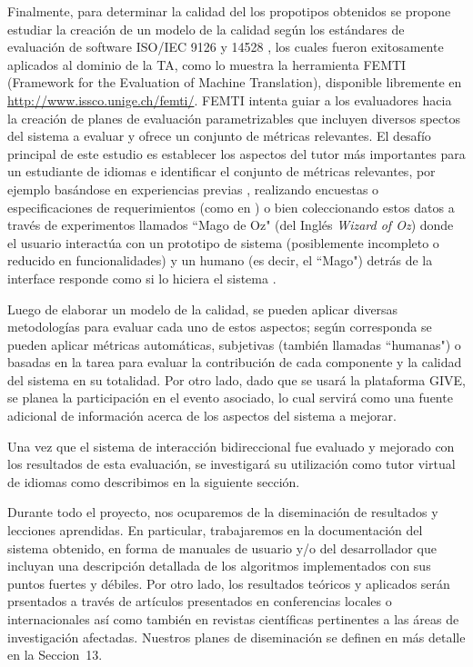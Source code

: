 Finalmente, para determinar la calidad del los propotipos obtenidos se propone
estudiar la creaci\'on de un modelo de la calidad seg\'un los est\'andares de
evaluaci\'on de software ISO/IEC 9126 y 14528 \citep{ISO9126-1, ISO14598-1}, los
cuales fueron exitosamente aplicados al dominio de la TA, como lo muestra la
herramienta FEMTI (Framework for the Evaluation of Machine Translation),
disponible libremente en \url{http://www.issco.unige.ch/femti/}. FEMTI
\citep{Est2005} intenta guiar a los evaluadores hacia la creaci\'on de planes de
evaluaci\'on parametrizables que incluyen diversos spectos del sistema a evaluar
y ofrece un conjunto de m\'etricas relevantes. El desaf\'io principal de este
estudio es establecer los aspectos del tutor m\'as importantes para un
estudiante de idiomas e identificar el conjunto de m\'etricas relevantes, por
ejemplo bas\'andose en experiencias previas \citep{paradise06, Chu2000,
Litman2002}, realizando encuestas o especificaciones de requerimientos (como en
\citep{Lecoeuche98}) o bien coleccionando estos datos a trav\'es de experimentos
llamados ``Mago de Oz" (del Ingl\'es \textit{Wizard of Oz}) donde el usuario
interact\'ua con un prototipo de sistema (posiblemente incompleto o reducido en
funcionalidades) y un humano (es decir, el ``Mago") detr\'as de la interface
responde como si lo hiciera el sistema \citep{Dahlback93, Fabbrizio05}.

Luego de elaborar un modelo de la calidad, se pueden aplicar diversas metodolog\'ias para evaluar cada uno de estos aspectos; seg\'un corresponda se pueden aplicar m\'etricas autom\'aticas, subjetivas (tambi\'en llamadas ``humanas") o basadas en la tarea para evaluar la contribuci\'on de cada componente y la calidad del sistema en su totalidad.
Por otro lado, dado que se usar\'a la plataforma GIVE, se planea la participaci\'on en el evento asociado, lo cual servir\'a como una fuente adicional de informaci\'on acerca de los aspectos del sistema a mejorar.

Una vez que el sistema de interacci\'on bidireccional fue evaluado y mejorado
con los resultados de esta evaluaci\'on,  
se investigar\'a su utilizaci\'on 
como tutor virtual de idiomas como describimos en la siguiente secci\'on. 


Durante todo el proyecto, nos ocuparemos de la diseminaci\'on de resultados y
lecciones aprendidas.  En particular, trabajaremos en la documentaci\'on del
sistema obtenido, en forma de manuales de usuario y/o del desarrollador que
incluyan una descripci\'on detallada de los algoritmos implementados con sus
puntos fuertes y d\'ebiles.
Por otro lado, los resultados te\'oricos y aplicados ser\'an prsentados a trav\'es de art\'iculos presentados en conferencias locales o internacionales as\'i como tambi\'en en revistas cient\'ificas pertinentes a las \'areas de investigaci\'on afectadas.  Nuestros
planes de diseminaci\'on se definen en m\'as detalle en la Seccion~13.


